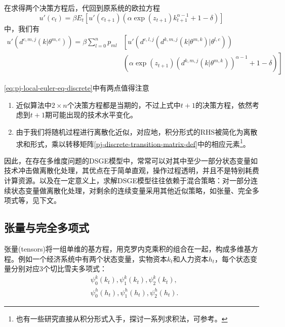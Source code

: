 在求得两个决策方程后，代回到原系统的欧拉方程
\begin{equation}
  \label{eq:pj-local-euler-eq}
  u'(c_t) = \beta E_t \left[ u'\left( c_{t+1} \right) \left( \alpha \exp(z_{t+1}) k_{t+1}^{\alpha - 1} + 1 - \delta \right) \right]
\end{equation}
中，我们有
\begin{equation}
  \label{eq:pj-local-euler-eq-discrete}
  \begin{split}
    u'\left( d^{c,m,j} \left( k | \theta^{m,c} \right)\right) = \beta \sum_{l=0}^{n} p_{ml} &\left[
    u'\left(
    d^{c,l,j}
    \left( d^{k,m,j} \left( k | \theta^{m,k} \right) | \theta^{l,c} \right)
     \right) \right. \\
     & \left. \left(
     \alpha \exp(z_{t+1})
     \left(
     d^{k,m,j} \left( k | \theta^{m,k} \right)
    \right)^{\alpha-1}
     + 1 - \delta
     \right)
    \right]
  \end{split}
\end{equation}

\eqref{eq:pj-local-euler-eq-discrete}中有两点值得注意
\begin{enumerate}
  \item 近似算法中$2 \times n$个决策方程都是当期的，不过上式中$t+1$的决策方程，依然考虑到$t+1$期可能出现的技术水平变化。
  \item  由于我们将随机过程进行离散化近似，对应地，积分形式的RHS被简化为离散求和形式，乘以转移矩阵\eqref{pj-discrete-transition-matrix-def}中的相应元素\footnote{也有一些研究直接从积分形式入手，探讨一系列求积法，可参考\cite{Judd:1998uy,Judd:2011iw}。}。
\end{enumerate}

因此，在存在多维度问题的DSGE模型中，常常可以对其中至少一部分状态变量如技术冲击做离散化处理，其优点在于简单直观，操作过程透明，并且不是特别耗费计算资源。以及在一定意义上，求解DSGE模型往往依赖于混合策略：对一部分连续状态变量做离散化处理，对剩余的连续变量采用其他近似策略，如张量、完全多项式等，见下文。


\subsection{张量与完全多项式}
\label{sec:pj-multidimen-tensor}
张量(tensors)将一组单维的基方程，用克罗内克乘积的组合在一起，构成多维基方程。例如一个经济系统中有两个状态变量，实物资本$k_t$和人力资本$h_t$，每个状态变量分别对应3个切比雪夫多项式：
\begin{equation*}
  \begin{split}
    &\psi_{0}^k(k_t),\psi_{1}^k(k_t),\psi_{2}^k(k_t),\\
    &\psi_{0}^h(h_t),\psi_{1}^h(h_t),\psi_{2}^h(h_t).
  \end{split}
\end{equation*}

